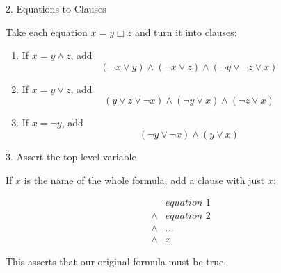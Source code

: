 \documentclass[xetex,aspectratio=169,14pt,hyperref={pdfpagelabels=true,pdflang={en-GB}}]{beamer}
\begin{document}
\begin{frame}
  {2. Equations to Clauses}

  Take each equation $x = y \mathop\Box z$ and turn it into clauses:
  \begin{enumerate}
  \item If $x = y \land z$, add
    \begin{displaymath}
      (\lnot x \lor y) \land (\lnot x \lor z) \land (\lnot y \lor \lnot z \lor x)
    \end{displaymath}
  \item If $x = y \lor z$, add
    \begin{displaymath}
      (y \lor z \lor \lnot x) \land (\lnot y \lor x) \land (\lnot z \lor x)
    \end{displaymath}
  \item If $x = \lnot y$, add
    \begin{displaymath}
      (\lnot y \lor \lnot x) \land (y \lor x)
    \end{displaymath}
  \end{enumerate}

\end{frame}

\begin{frame}
  {3. Assert the top level variable}

  If $x$ is the name of the whole formula, add a clause with just
  $x$:

  \begin{displaymath}
    \begin{array}{cl}
      &\textit{equation 1} \\
      \land&\textit{equation 2}\\
      \land&...\\
      \land&x
    \end{array}
  \end{displaymath}

  This asserts that our original formula must be true.
\end{frame}
\end{document}
